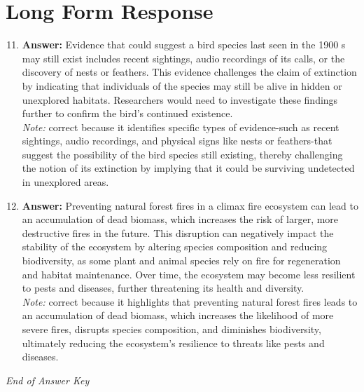 \documentclass[12pt]{article}
\begin{document}
\section*{Long Form Response}
\begin{enumerate}[label=\arabic*.]
\setcounter{enumi}{10}
\item \textbf{Answer:} Evidence that could suggest a bird species last seen in the 1900 s may still exist includes recent sightings, audio recordings of its calls, or the discovery of nests or feathers. This evidence challenges the claim of extinction by indicating that individuals of the species may still be alive in hidden or unexplored habitats. Researchers would need to investigate these findings further to confirm the bird's continued existence.
\\ \textit{Note:} correct because it identifies specific types of evidence-such as recent sightings, audio recordings, and physical signs like nests or feathers-that suggest the possibility of the bird species still existing, thereby challenging the notion of its extinction by implying that it could be surviving undetected in unexplored areas.
\item \textbf{Answer:} Preventing natural forest fires in a climax fire ecosystem can lead to an accumulation of dead biomass, which increases the risk of larger, more destructive fires in the future. This disruption can negatively impact the stability of the ecosystem by altering species composition and reducing biodiversity, as some plant and animal species rely on fire for regeneration and habitat maintenance. Over time, the ecosystem may become less resilient to pests and diseases, further threatening its health and diversity.
\\ \textit{Note:} correct because it highlights that preventing natural forest fires leads to an accumulation of dead biomass, which increases the likelihood of more severe fires, disrupts species composition, and diminishes biodiversity, ultimately reducing the ecosystem's resilience to threats like pests and diseases.
\end{enumerate}

\vfill
\noindent\textit{End of Answer Key}
\end{document}
